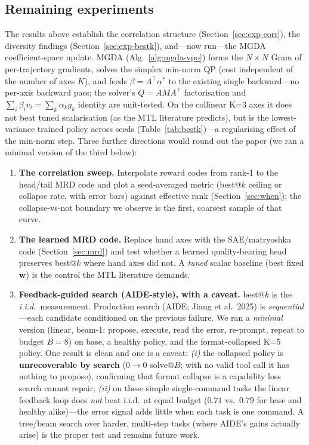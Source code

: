 \documentclass[11pt,a4paper]{article}
\begin{document}
\subsection{Remaining experiments}
\label{sec:remaining}

The results above establish the correlation structure
(Section~\ref{sec:exp-corr}), the diversity findings
(Section~\ref{sec:exp-bestk}), and---now run---the MGDA coefficient-space
update.  MGDA (Alg.~\ref{alg:mgda-vpo}) forms the $N\times N$ Gram of
per-trajectory gradients, solves the simplex min-norm QP (cost independent of
the number of axes $K$), and feeds $\beta=A^\top\alpha^*$ to the existing single
backward---no per-axis backward pass; the solver's $Q=AMA^\top$ factorisation
and $\sum_i\beta_i v_i = \sum_k\alpha_k g_k$ identity are unit-tested.  On the
collinear K=3 axes it does not beat tuned scalarisation (as the MTL literature
predicts), but is the lowest-variance trained policy across seeds
(Table~\ref{tab:bestk})---a regularising effect of the min-norm step.  Three
further directions would round out the paper (we ran a minimal version of the
third below):
\begin{enumerate}[nosep]
\item \textbf{The correlation sweep.}  Interpolate reward codes from rank-1 to
  the head/tail MRD code and plot a seed-averaged metric (best@$k$ ceiling or
  collapse rate, with error bars) against effective rank
  (Section~\ref{sec:when}); the collapse-vs-not boundary we observe is the first,
  coarsest sample of that curve.
\item \textbf{The learned MRD code.}  Replace hand axes with the SAE/matryoshka
  code (Section~\ref{sec:mrd}) and test whether a learned quality-bearing head
  preserves best@$k$ where hand axes did not.  A \emph{tuned} scalar baseline
  (best fixed $\bm w$) is the control the MTL literature demands.
\item \textbf{Feedback-guided search (AIDE-style), with a caveat.}  best@$k$ is
  the \emph{i.i.d.}\ measurement.  Production search (AIDE; Jiang et al.\ 2025) is
  \emph{sequential}---each candidate conditioned on the previous failure.  We ran
  a \emph{minimal} version (linear, beam-1: propose, execute, read the error,
  re-prompt, repeat to budget $B{=}8$) on base, a healthy policy, and the
  format-collapsed K=5 policy.  One result is clean and one is a caveat:
  \emph{(i)} the collapsed policy is \textbf{unrecoverable by search}
  ($0\!\to\!0$ solve@$B$; with no valid tool call it has nothing to propose),
  confirming that format collapse is a capability loss search cannot repair;
  \emph{(ii)} on these simple single-command tasks the linear feedback loop does
  \emph{not} beat i.i.d.\ at equal budget ($0.71$ vs.\ $0.79$ for base and
  healthy alike)---the error signal adds little when each task is one command.
  A tree/beam search over harder, multi-step tasks (where AIDE's gains actually
  arise) is the proper test and remains future work.
\end{enumerate}
\end{document}
